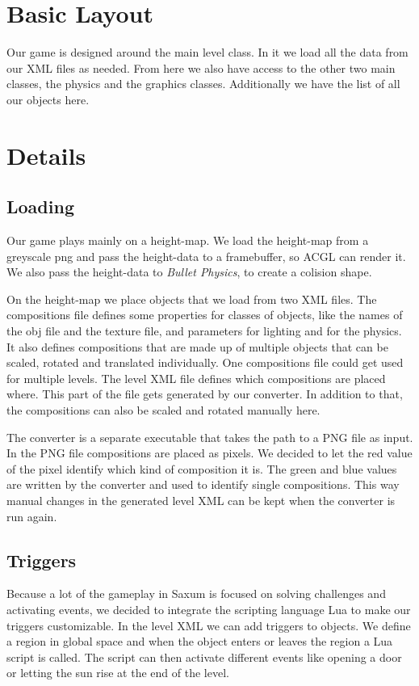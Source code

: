 \documentclass[sponsored]{acmsiggraph}
\begin{document}
\section{Basic Layout}

Our game is designed around the main level class. In it we load all the data from our XML files as needed. From here we also have access to the other two main classes, the physics and the graphics classes. Additionally we have the list of all our objects here.

\section{Details}

\subsection{Loading}

Our game plays mainly on a height-map. We load the height-map from a greyscale png and pass the height-data to a framebuffer, so ACGL can render it. We also pass the height-data to \textit{Bullet Physics}, to create a colision shape.

On the height-map we place objects that we load from two XML files. The compositions file defines some properties for classes of objects, like the names of the obj file and the texture file, and parameters for lighting and for the physics. It also defines compositions that are made up of multiple objects that can be scaled, rotated and translated individually. One compositions file could get used for multiple levels. The level XML file defines which compositions are placed where. This part of the file gets generated by our converter. In addition to that, the compositions can also be scaled and rotated manually here.

The converter is a separate executable that takes the path to a PNG file as input. In the PNG file compositions are placed as pixels.
We decided to let the red value of the pixel identify which kind of composition it is. The green and blue values are written by the converter and used to identify single compositions. This way manual changes in the generated level XML can be kept when the converter is run again.

\subsection{Triggers}

Because a lot of the gameplay in Saxum is focused on solving challenges and activating events, we decided to integrate the scripting language Lua to make our triggers customizable. In the level XML we can add triggers to objects. We define a region in global space and when the object enters or leaves the region a Lua script is called. The script can then activate different events like opening a door or letting the sun rise at the end of the level.
\end{document}
